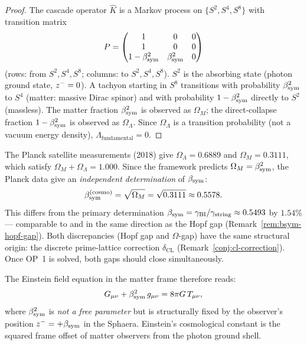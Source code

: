 \begin{proof}
The cascade operator $\hat{K}$ is a Markov process on $\{S^2,S^4,S^8\}$
with transition matrix
\[
 P = \begin{pmatrix} 1 & 0 & 0 \\ 1 & 0 & 0 \\ 1-\beta_{\mathrm{sym}}^2 & \beta_{\mathrm{sym}}^2 & 0 \end{pmatrix}
\]
(rows: from $S^2,S^4,S^8$; columns: to $S^2,S^4,S^8$).
$S^2$ is the absorbing state (photon ground state, $z^-=0$).
A tachyon starting in $S^8$ transitions with probability $\beta_{\mathrm{sym}}^2$ to
$S^4$ (matter: massive Dirac spinor) and with probability $1-\beta_{\mathrm{sym}}^2$
directly to $S^2$ (massless).
The matter fraction $\beta_{\mathrm{sym}}^2$ is observed as $\Omega_M$; the
direct-collapse fraction $1-\beta_{\mathrm{sym}}^2$ is observed as $\Omega_\Lambda$.
Since $\Omega_\Lambda$ is a transition probability (not a vacuum energy
density), $\Lambda_{\mathrm{fundamental}}=0$.
\end{proof}


\begin{remark}
\label{rem:omega-bsym}
The Planck satellite measurements (2018) give $\Omega_\Lambda = 0.6889$
and $\Omega_M = 0.3111$, which satisfy $\Omega_M + \Omega_\Lambda = 1.000$.
Since the framework predicts $\Omega_M = \beta_{\mathrm{sym}}^2$, the Planck data give
an \emph{independent determination} of $\beta_{\mathrm{sym}}$:
\[
 \beta_{\mathrm{sym}}^{(\mathrm{cosmo})}
 = \sqrt{\Omega_M} = \sqrt{0.3111} \approx 0.5578.
\]
This differs from the primary determination
$\beta_{\mathrm{sym}} = \gamma_{\mathrm{BI}}/\gamma_{\mathrm{string}}\approx 0.5493$ by $1.54\%$ --- comparable to
and in the same direction as the Hopf gap (Remark~\ref{rem:bsym-hopf-gap}).
Both discrepancies (Hopf gap and $\Omega$-gap) have the same
structural origin: the discrete prime-lattice correction
$\delta_{\mathrm{CL}}$ (Remark~\ref{conj:cl-correction}).
Once OP~1 is solved, both gaps should close simultaneously.

\medskip
\noindent The Einstein field equation in the matter frame therefore reads:
\[
 G_{\mu\nu} + \beta_{\mathrm{sym}}^2\,g_{\mu\nu} = 8\pi G\,T_{\mu\nu},
\]
where $\beta_{\mathrm{sym}}^2$ is \emph{not a free parameter} but is structurally
fixed by the observer's position $z^- = +\beta_{\mathrm{sym}}$ in the Sphaera.
Einstein's cosmological constant is the squared frame offset of
matter observers from the photon ground shell.
\end{remark}

